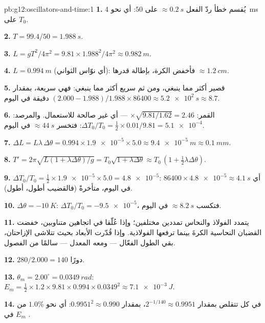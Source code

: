 \begin{solution}{pb:g12:oscillators-and-time:1}
\textbf{1.} يُقسم خطأ ردّ الفعل $\approx \qty{0.2}{s}$ على
$50$: أي نحو \qty{4}{ms} على $T_0$.

\textbf{2.} $T = 99.4/50 = \qty{1.988}{s}$.

\textbf{3.} $L = gT^2/4\pi^2 = 9.81 \times 1.988^2/4\pi^2 \approx
\qty{0.982}{m}$.

\textbf{4.} $L = \qty{0.994}{m}$ (أي نوّاس الثواني): فأخفض
الكرة، بإطالة قدرها $\approx \qty{1.2}{cm}$.

\textbf{5.} قصير أكثر مما ينبغي، ومن ثم سريع أكثر مما ينبغي: فهي سريعة، بمقدار $(2.000 -
1.988)/1.988 \times 86400 \approx \qty{5.2e2}{s} \approx 8.7$
دقيقة في اليوم.

\textbf{6.} القمر: $\times\sqrt{9.81/1.62} = 2.46$ --- أي غير صالحة للاستعمال.
والمرصد: $\Delta T_0/T_0 = \tfrac12 \times 0.01/9.81 =
\num{5.1e-4}$: فتخسر $\approx \qty{44}{s}$ في اليوم.

\textbf{7.} $\Delta L = L\lambda\,\Delta\theta = 0.994 \times
\num{1.9e-5} \times 5.0 \approx \qty{9.4e-5}{m} \approx
\qty{0.1}{mm}$.

\textbf{8.} $T' = 2\pi\sqrt{L(1 + \lambda\Delta\theta)/g} =
T_0\sqrt{1 + \lambda\Delta\theta} \approx T_0\,(1 + \tfrac12
\lambda\Delta\theta)$.

\textbf{9.} $\Delta T_0/T_0 = \tfrac12 \times \num{1.9e-5} \times
5.0 = \num{4.8e-5}$: أي $86400 \times \num{4.8e-5} \approx
\qty{4.1}{s}$ في اليوم، متأخرةً (فالقضيب أطول،  أطول).

\textbf{10.} $\Delta\theta = \qty{-10}{K}$: $\Delta T_0/T_0 =
\num{-9.5e-5}$، فتكسب $\approx \qty{8.2}{s}$ في اليوم.

\textbf{11.} يتمدد الفولاذ والنحاس تمددين مختلفين؛ وإذا عُلّقا في اتجاهين
متناوبين، خفضت القضبان النحاسية الكرةَ بينما ترفعها الفولاذية.
وإذا قُدّرت الأبعاد بحيث تتلاشى الإزاحتان، بقي الطول الفعّال ---
ومعه المعدل --- سالمًا من الفصول.

\textbf{12.} $280/2.000 = 140$ دورًا.

\textbf{13.} $\theta_m = 2.00^\circ = \qty{0.0349}{rad}$: $E_m =
\tfrac12 \times 1.2 \times 9.81 \times 0.994 \times 0.0349^2 \approx
\qty{7.1e-3}{J}$.

\textbf{14.} في كل  تتقلص  بمقدار $2^{-1/140} \approx
0.9951$،  بمقدار $0.9951^2 \approx 0.990$: أي نحو $1.0\%$ من
$E_m$ في .


\end{solution}

